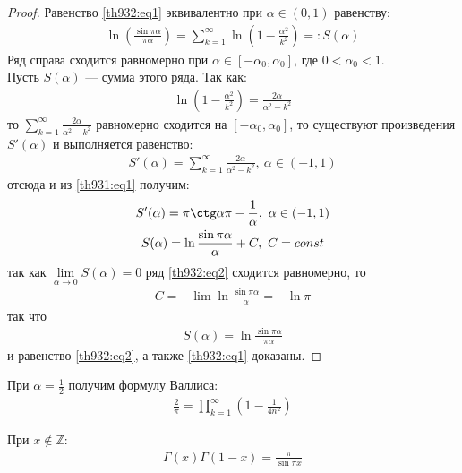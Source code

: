 \begin{proof}
  Равенство \eqref{th932:eq1} эквивалентно при $\alpha \in (0, 1)$ равенству:
  \begin{gather}
    \ln \left(\frac{\sin \pi \alpha}{\pi \alpha}\right) = \sum\limits_{k =
    1}^{\infty} \ln \left(1 - \frac{\alpha^2}{k^2} \right) =: S(\alpha)
    \label{th932:eq2}
  \end{gather}
  Ряд справа сходится равномерно при $\alpha \in [-\alpha_0, \alpha_0]$, где $0
  < \alpha_0 < 1$. \\
  Пусть $S(\alpha)$ --- сумма этого ряда. Так как:
  \begin{gather*}
    \ln \left(1 - \frac{\alpha^2}{k^2}\right) = \frac{2\alpha}{\alpha^2 - k^2}
  \end{gather*}
  то $\sum\limits_{k = 1}^{\infty} \frac{2\alpha}{\alpha^2 - k^2}$
  равномерно сходится на $[-\alpha_0, \alpha_0]$, то существуют произведения
  $S'(\alpha)$ и выполняется равенство:
  \begin{gather*}
    S'(\alpha) = \sum\limits_{k = 1}^{\infty} \frac{2\alpha}{\alpha^2 - k^2}, \
    \alpha \in (-1, 1)
  \end{gather*}
  отсюда и из \eqref{th931:eq1} получим:
  \begin{gather*}
    S'(\alpha) = \pi \ctg \alpha \pi - \frac{1}{\alpha}, \ \alpha \in (-1, 1) \\
    S(\alpha) = \ln \frac{\sin \pi \alpha}{\alpha} + C, \ C = const
  \end{gather*}
  так как $\lim\limits_{\alpha \to 0} S(\alpha) = 0$ ряд \eqref{th932:eq2}
  сходится равномерно, то
  \begin{gather*}
    C = - \lim \ln \frac{\sin \pi \alpha}{\alpha} = - \ln \pi
  \end{gather*}
  так что
  \begin{gather*}
    S(\alpha) = \ln \frac{\sin \pi \alpha}{\pi \alpha}
  \end{gather*}
  и равенство \eqref{th932:eq2}, а также \eqref{th932:eq1} доказаны.
\end{proof}

\begin{consequence}
  При $\alpha = \frac{1}{2}$ получим формулу Валлиса:
  \begin{gather}
    \frac{2}{\pi} = \prod\limits_{k = 1}^\infty \left(1 - \frac{1}{4n^2}\right)
    \label{th932:eq3}
  \end{gather}
\end{consequence}

\begin{theorem}
  При $x \not \in \mathbb{Z}$:
  \begin{gather}
    \Gamma(x) \Gamma(1 - x) = \frac{\pi}{\sin \pi x}
    \label{th933:eq1}
  \end{gather}
\end{theorem}

